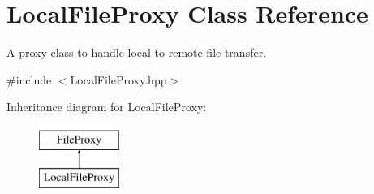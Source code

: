 \hypertarget{classLocalFileProxy}{
\section{LocalFileProxy Class Reference}
\label{classLocalFileProxy}
}


A proxy class to handle local to remote file transfer.  




{\ttfamily \#include $<$LocalFileProxy.hpp$>$}

Inheritance diagram for LocalFileProxy:\begin{figure}[H]
\begin{center}
\leavevmode
\includegraphics[height=2.000000cm]{classLocalFileProxy}
\end{center}
\end{figure}
